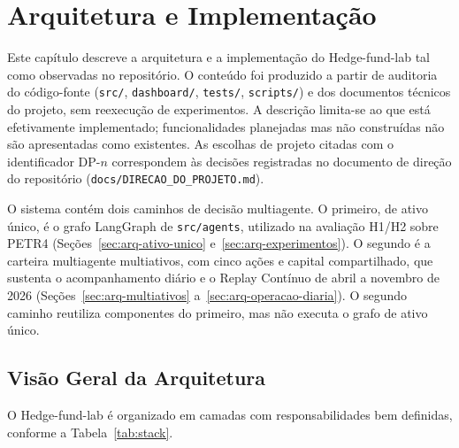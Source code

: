 \documentclass{eic-bcc-tcc}
\begin{document}
\chapter{Arquitetura e Implementação}
\label{cha:arquitetura}

Este capítulo descreve a arquitetura e a implementação do Hedge-fund-lab tal como observadas no repositório. O conteúdo foi produzido a partir de auditoria do código-fonte (\texttt{src/}, \texttt{dashboard/}, \texttt{tests/}, \texttt{scripts/}) e dos documentos técnicos do projeto, sem reexecução de experimentos. A descrição limita-se ao que está efetivamente implementado; funcionalidades planejadas mas não construídas não são apresentadas como existentes. As escolhas de projeto citadas com o identificador DP-$n$ correspondem às decisões registradas no documento de direção do repositório (\texttt{docs/DIRECAO\_DO\_PROJETO.md}).

O sistema contém dois caminhos de decisão multiagente. O primeiro, de ativo único, é o grafo LangGraph de \texttt{src/agents}, utilizado na avaliação H1/H2 sobre PETR4 (Seções~\ref{sec:arq-ativo-unico} e~\ref{sec:arq-experimentos}). O segundo é a carteira multiagente multiativos, com cinco ações e capital compartilhado, que sustenta o acompanhamento diário e o Replay Contínuo de abril a novembro de 2026 (Seções~\ref{sec:arq-multiativos} a~\ref{sec:arq-operacao-diaria}). O segundo caminho reutiliza componentes do primeiro, mas não executa o grafo de ativo único.

\section{Visão Geral da Arquitetura}

O Hedge-fund-lab é organizado em camadas com responsabilidades bem definidas, conforme a Tabela~\ref{tab:stack}.
\end{document}

